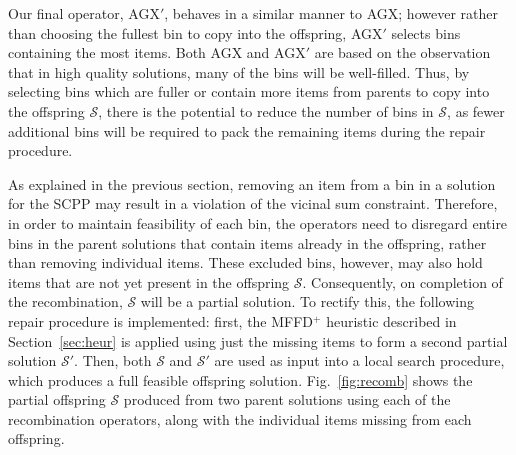 \documentclass[a4paper,11pt,authoryear]{elsarticle}
\begin{document}
Our final operator, AGX$'$, behaves in a similar manner to AGX; however rather than choosing the fullest bin to copy into the offspring, AGX$'$ selects bins containing the most items. Both AGX and AGX$'$ are based on the observation that in high quality solutions, many of the bins will be well-filled. Thus, by selecting bins which are fuller or contain more items from parents to copy into the offspring $\mathcal{S}$, there is the potential to reduce the number of bins in $\mathcal{S}$, as fewer additional bins will be required to pack the remaining items during the repair procedure.

As explained in the previous section, removing an item from a bin in a solution for the SCPP may result in a violation of the vicinal sum constraint. Therefore, in order to maintain feasibility of each bin, the operators need to disregard entire bins in the parent solutions that contain items already in the offspring, rather than removing individual items. These excluded bins, however, may also hold items that are not yet present in the offspring $\mathcal{S}$. Consequently, on completion of the recombination, $\mathcal{S}$ will be a partial solution. To rectify this, the following repair procedure is implemented: first, the MFFD$^+$ heuristic described in Section~\ref{sec:heur} is applied using just the missing items to form a second partial solution $\mathcal{S}'$. Then, both $\mathcal{S}$ and $\mathcal{S}'$ are used as input into a local search procedure, which produces a full feasible offspring solution. Fig.~\ref{fig:recomb} shows the partial offspring $\mathcal{S}$ produced from two parent solutions using each of the recombination operators, along with the individual items missing from each offspring.

\begin{figure}[h!]	
	\centering
	\begin{minipage}{0.28\textwidth}
		
	\end{minipage} \hspace{15mm}
	\begin{minipage}{0.28\textwidth}
		
	\end{minipage}
\end{figure}
\end{document}

